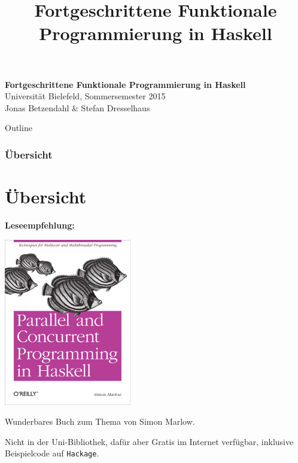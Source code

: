 \documentclass{beamer}
\title{Fortgeschrittene Funktionale Programmierung in Haskell}
\begin{document}
  

  \begin{frame}
  \begin{center}
    \huge\textbf{Fortgeschrittene Funktionale Programmierung in Haskell}\\ \bigskip
    \LARGE Universität Bielefeld, Sommersemester 2015\\ \bigskip
    \large Jonas Betzendahl \& Stefan Dresselhaus
    \end{center}
  \end{frame}

\begin{frame}[allowframebreaks]{Outline}
\frametitle{Übersicht}
\tableofcontents
\end{frame}

\section{Übersicht}


\begin{frame}[fragile]

\Large
\textbf{Leseempfehlung:}
\normalsize

\begin{multicols}{2}
\includegraphics[scale=0.45]{parcur.png} 
\columnbreak

Wunderbares Buch zum Thema von Simon Marlow.\pause\bigskip

Nicht in der Uni-Bibliothek, dafür aber Gratis im Internet verfügbar, inklusive Beispielcode auf \texttt{Hackage}.
\end{multicols}

\end{frame}
\end{document}
